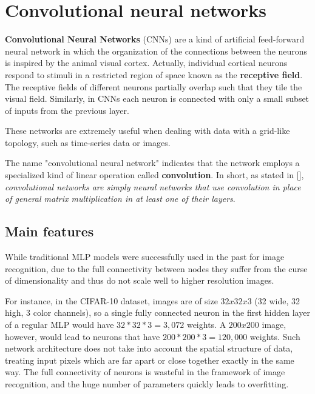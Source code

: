 \chapter{Convolutional neural networks}\label{ch:conv_nets}

\textbf{Convolutional Neural Networks} (\acsp{CNN}) are a kind of artificial feed-forward neural network in which the organization of the connections between the neurons is inspired by the animal visual cortex. Actually, individual cortical neurons respond to stimuli in a restricted region of space known as the \textbf{receptive field}. The receptive fields of different neurons partially overlap such that they tile the visual field. Similarly, in \acsp{CNN} each neuron is connected with only a small subset of inputs from the previous layer.

These networks are extremely useful when dealing with data with a grid-like topology, such as time-series data or images.

The name "convolutional neural network" indicates that the network employs a specialized kind of linear operation called \textbf{convolution}. In short, as stated in [\cite{Goodfellow-et-al-2016}], \emph{convolutional networks are simply neural networks that use convolution in place of general matrix multiplication in at least one of their layers}.

\section{Main features}

While traditional \acf{MLP} models were successfully used in the past for image recognition, due to the full connectivity between nodes they suffer from the curse of dimensionality and thus do not scale well to higher resolution images.

For instance, in the CIFAR-10 dataset, images are of size $32x32x3$ (32 wide, 32 high, 3 color channels), so a single fully connected neuron in the first hidden layer of a regular \ac{MLP} would have $32*32*3 = 3,072$ weights. A $200x200$ image, however, would lead to neurons that have $200*200*3 = 120,000$ weights.
Such network architecture does not take into account the spatial structure of data, treating input pixels which are far apart or close together exactly in the same way. The full connectivity of neurons is wasteful in the framework of image recognition, and the huge number of parameters quickly leads to overfitting.

